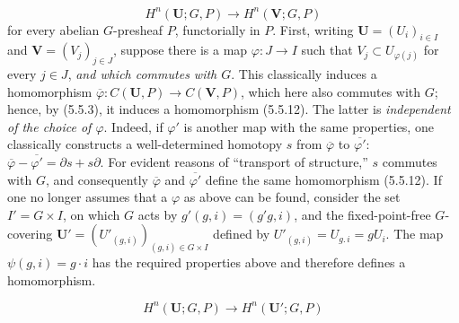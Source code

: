\[
\tag{5.5.12}
H^n({\mathbf U};G,P)\to H^n({\mathbf V};G,P)
\]
for every abelian $G$-presheaf $P$, functorially in $P$. First, writing
${\mathbf U}=(U_i)_{i\in I}$ and ${\mathbf V}=(V_j)_{j\in J}$, suppose there is
a map $\varphi:J\to I$ such that $V_j\subset U_{\varphi(j)}$ for every
$j\in J$, \textit{and which commutes with $G$}. This classically induces a homomorphism
$\overline\varphi:C({\mathbf U},P)\to C({\mathbf V},P)$, which here also
commutes with $G$; hence, by (5.5.3), it induces a homomorphism (5.5.12). The
latter is \textit{independent of the choice of $\varphi$}. Indeed, if
$\varphi'$ is another map with the same properties, one classically constructs
a well-determined homotopy $s$ from $\overline\varphi$ to
$\overline{\varphi'}$:
$\overline\varphi-\overline{\varphi'}=\partial s+s\partial$. For evident
reasons of ``transport of structure,'' $s$ commutes with $G$, and consequently
$\overline\varphi$ and $\overline{\varphi'}$ define the same homomorphism
(5.5.12).
If one no longer assumes that a $\varphi$ as above can be found, consider the
set $I'=G\times I$, on which $G$ acts by $g'(g,i)=(g'g,i)$, and the
fixed-point-free $G$-covering ${\mathbf U}'=(U'_{(g,i)})_{(g,i)\in G\times I}$
defined by $U'_{(g,i)}=U_{g.\,i}=gU_i$. The map
$\psi(g,i)=g\cdot i$ has the required properties above and therefore defines
a homomorphism.

\[
H^n({\mathbf U};G,P)\to H^n({\mathbf U}';G,P)
\]

